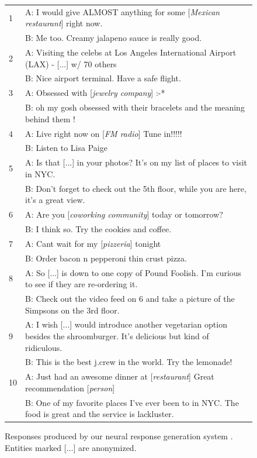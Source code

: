 \documentclass[letterpaper]{article}
\begin{document}
\begin{figure}[ht]
\centering
\begin{small}
\begin{tabular}{ll}\toprule
1& A: I would give ALMOST anything for some [{\it Mexican restaurant}] right now.\\ 
& B: Me too. Creamy jalapeno sauce is really good.\\
\midrule
2& A: Visiting the celebs at Los Angeles International Airport (LAX) - [...] w/ 70 others\\
& B: Nice airport terminal. Have a safe flight.\\
\midrule
3& A: Obsessed with [{\it jewelry company}] :-*\\
& B: oh my gosh obsessed with their bracelets and the meaning behind them !\\
\midrule
4&A: Live right now on [{\it FM radio}] Tune in!!!!!\\
&B: Listen to Lisa Paige\\
\midrule
5& A: Is that [...] in your photos? It's on my list of places to visit in NYC.\\
& B: Don't forget to check out the 5th floor, while you are here, it's a great view.\\
\midrule
6& A: Are you [{\it coworking community}] today or tomorrow?\\
& B: I think so. Try the cookies and coffee.\\
\midrule
7&A: Cant wait for my [{\it pizzeria}] tonight\\
&B: Order bacon n pepperoni thin crust pizza.\\
\midrule
8&A: So [...] is down to one copy of Pound Foolish. I'm curious to see if they are re-ordering it.\\
&B: Check out the video feed on 6 and take a picture of the Simpsons on the 3rd floor.\\
\midrule
\midrule
9&A: I wish [...] would introduce another vegetarian option besides the shroomburger. It's delicious but kind of ridiculous.\\
&B: This is the best j.crew in the world. Try the lemonade!\\
\midrule
10&A: Just had an awesome dinner at [{\it restaurant}] Great recommendation [{\it person}]\\
&B: One of my favorite places I've ever been to in NYC. The food is great and the service is lackluster.\\
\bottomrule
\end{tabular}
\end{small}
\caption{Responses produced by our neural response generation system \MTaskRF. Entities marked [...] are anonymized.}
\label{fig:examples}
\end{figure}
\end{document}
